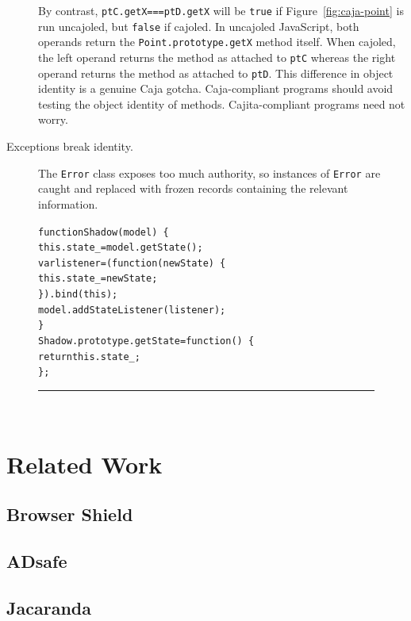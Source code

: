 \documentclass[letterpaper,twocolumn,10pt]{article}
\newcommand{\code}[1]{{\tt {#1}}}              %
\begin{document}
\begin{description}
  By contrast, \code{ptC.getX===ptD.getX} will be \code{true} if 
  Figure~\ref{fig:caja-point} is run uncajoled, but \code{false} if cajoled. 
  In uncajoled JavaScript, both operands return the 
  \code{Point.prototype.getX} method itself. When cajoled, the left operand 
  returns the method as attached to \code{ptC} whereas the right operand 
  returns the method as attached to \code{ptD}. This difference in 
  object identity is a genuine Caja gotcha. Caja-compliant programs should 
  avoid testing the object identity of methods. Cajita-compliant programs 
  need not worry.

  \item[Exceptions break identity.]  The \code{Error} class exposes too much
  authority, so instances of \code{Error} are caught and replaced with frozen
  records containing the relevant information.
\end{description}


\begin{figure}[t!]
\begin{alltt}
function Shadow(model)\ \{
  this.state_ = model.getState();
  var listener = (function(newState)\ \{
    this.state_ = newState;
  \}).bind(this);
  model.addStateListener(listener);
\}
Shadow.prototype.getState = function()\ \{
  return this.state_;
\};
\end{alltt}

\caption[A Caja Inline Method.]{\\ } 
\hrule
\label{fig:caja-attached-method}
\end{figure}


\section{Related Work}
\label{sec:related}

\subsection{Browser Shield}


\subsection{ADsafe}


\subsection{Jacaranda}
\end{document}

